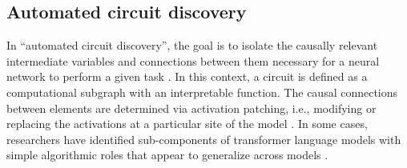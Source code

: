%
%
%

\subsection{Automated circuit discovery}

In ``automated circuit discovery'', the goal is to isolate the causally relevant intermediate variables and connections between them necessary for a neural network to perform a given task \citep{olah_zoom_2020}.
In this context, a circuit is defined as a computational subgraph with an interpretable function.
The causal connections between elements are determined via activation patching, i.e., modifying or replacing the activations at a particular site of the model \citep{meng_locating_2022,zhang_best_2023,wang_interpretability_2022,hanna_how_2023}.
In some cases, researchers have identified sub-components of transformer language models with simple algorithmic roles that appear to generalize across models \citep{olsson_context_2022}.

